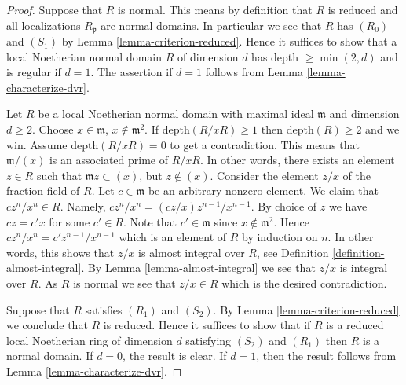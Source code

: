 \begin{proof}
Suppose that $R$ is normal. This means by definition that $R$
is reduced and all localizations $R_{\mathfrak p}$ are normal domains.
In particular we see that $R$ has $(R_0)$ and $(S_1)$ by
Lemma \ref{lemma-criterion-reduced}. Hence it suffices to show
that a local Noetherian normal domain $R$ of dimension $d$ has
depth $\geq \min(2, d)$ and is regular if $d = 1$. The assertion
if $d = 1$ follows from Lemma \ref{lemma-characterize-dvr}.

\medskip\noindent
Let $R$ be a local Noetherian normal domain with maximal ideal
$\mathfrak m$ and dimension $d \geq 2$. Choose
$x \in \mathfrak m$, $x \not \in \mathfrak m^2$. If $\text{depth}(R/xR) \geq 1$
then $\text{depth}(R) \geq 2$ and we win. Assume $\text{depth}(R/xR) = 0$ to
get a contradiction.
This means that $\mathfrak m/(x)$ is an associated prime of $R/xR$.
In other words, there exists an element $z \in R$ such that
$\mathfrak m z \subset (x)$, but $z \not \in (x)$. Consider the
element $z/x$ of the fraction field of $R$. Let $c \in \mathfrak m$
be an arbitrary nonzero element. We claim that $c z^n/x^n \in R$.
Namely, $c z^n/x^n = (cz/x) z^{n - 1}/x^{n - 1}$. By choice of
$z$ we have $cz = c' x$ for some $c' \in R$. Note that
$c' \in \mathfrak m$ since $x \not \in \mathfrak m^2$. Hence
$c z^n/x^n = c' z^{n - 1}/x^{n - 1}$ which is an element of $R$
by induction on $n$. In other words, this shows that $z/x$
is almost integral over $R$, see Definition \ref{definition-almost-integral}.
By Lemma \ref{lemma-almost-integral} we see that $z/x$ is integral over $R$.
As $R$ is normal we see that $z/x \in R$ which is the desired contradiction.

\medskip\noindent
Suppose that $R$ satisfies $(R_1)$ and $(S_2)$.
By Lemma \ref{lemma-criterion-reduced} we conclude that $R$ is
reduced. Hence it suffices to show that if $R$ is a reduced local
Noetherian ring of dimension $d$ satisfying $(S_2)$ and $(R_1)$
then $R$ is a normal domain. If $d = 0$, the result is clear.
If $d = 1$, then the result follows from Lemma \ref{lemma-characterize-dvr}.


\end{proof}
